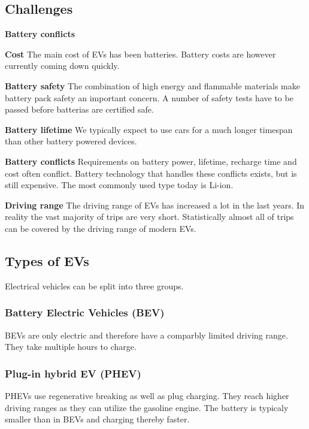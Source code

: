 \subsection{Challenges}

\begin{labeling}{\textbf{Battery conflicts}}
    \item [\textbf{Cost}]
    The main cost of EVs has been batteries.
    Battery costs are however currently coming down quickly.
    \item [\textbf{Battery safety}]
    The combination of high energy and flammable materials make battery pack safety an important concern.
    A number of safety tests have to be passed before batterias are certified safe.
    \item [\textbf{Battery lifetime}]
    We typically expect to use cars for a much longer timespan than other battery powered devices.
    \item [\textbf{Battery conflicts}]
    Requirements on battery power, lifetime, recharge time and cost often conflict.
    Battery technology that handles these conflicts exists, but is still expensive.
    The most commonly used type today is Li-ion.
    \item [\textbf{Driving range}]
    The driving range of EVs has increased a lot in the last years.
    In reality the vast majority of trips are very short.
    Statistically almost all of trips can be covered by the driving range of modern EVs.
\end{labeling}

\subsection{Types of EVs}
Electrical vehicles can be split into three groups.

\subsubsection{Battery Electric Vehicles (BEV)}
BEVs are only electric and therefore have a comparbly limited driving range. They take multiple hours to charge.

\subsubsection{Plug-in hybrid EV (PHEV)}
PHEVs use regenerative breaking as well as plug charging.
They reach higher driving ranges as they can utilize the gasoline engine.
The battery is typicaly smaller than in BEVs and charging thereby faster.

